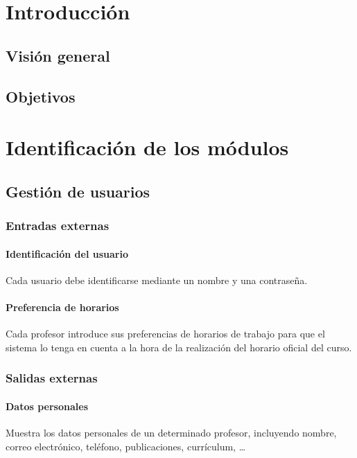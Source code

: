 \documentclass[11pt,a4paper,spanish,twoside]{book}
\begin{document}
\tableofcontents
\listoftables

\chapter*{Introducción}

\section{Visión general}

\section{Objetivos}

\chapter{Identificación de los módulos}
\section{Gestión de usuarios}
\subsection{Entradas externas}
\subsubsection{Identificación del usuario}
Cada usuario debe identificarse mediante un nombre y una contraseña.

\subsubsection{Preferencia de horarios} 
Cada profesor introduce sus preferencias de horarios de trabajo para que el
sistema lo tenga en cuenta a la hora de la realización del horario oficial
del curso.
\subsection{Salidas externas}
\subsubsection{Datos personales}
Muestra los datos personales de un determinado profesor, incluyendo
nombre, correo electrónico, teléfono, publicaciones, currículum, \dots
\end{document}
